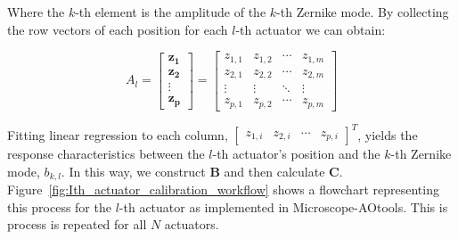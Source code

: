 Where the $k$-th element is the amplitude of the $k$-th Zernike mode. By collecting the row vectors of each position for each $l$-th actuator we can obtain:

\begin{equation}\label{eq:zernike_amp_actuator}
A_l = 
\begin{bmatrix}
\boldsymbol{z_{1}}\\
\boldsymbol{z_{2}}\\
\vdots\\
\boldsymbol{z_{p}} 
\end{bmatrix}
=
\begin{bmatrix}
z_{1,1} & z_{1,2} & \cdots & z_{1,m} \\
z_{2,1} & z_{2,2} & \cdots & z_{2,m} \\
\vdots  & \vdots  & \ddots & \vdots  \\
z_{p,1} & z_{p,2} & \cdots & z_{p,m} 
\end{bmatrix}
\end{equation}

Fitting linear regression to each column, $\begin{bmatrix} z_{1,i} & z_{2,i} & \cdots & z_{p,i} \end{bmatrix}^T$, yields the response characteristics between the $l$-th actuator's position and the $k$-th Zernike mode, $b_{k,l}$. In this way, we construct $\boldsymbol{B}$ and then calculate $\boldsymbol{C}$. Figure~\ref{fig:Ith_actuator_calibration_workflow} shows a flowchart representing this process for the $l$-th actuator as implemented in Microscope-AOtools. This is process is repeated for all $N$ actuators.

